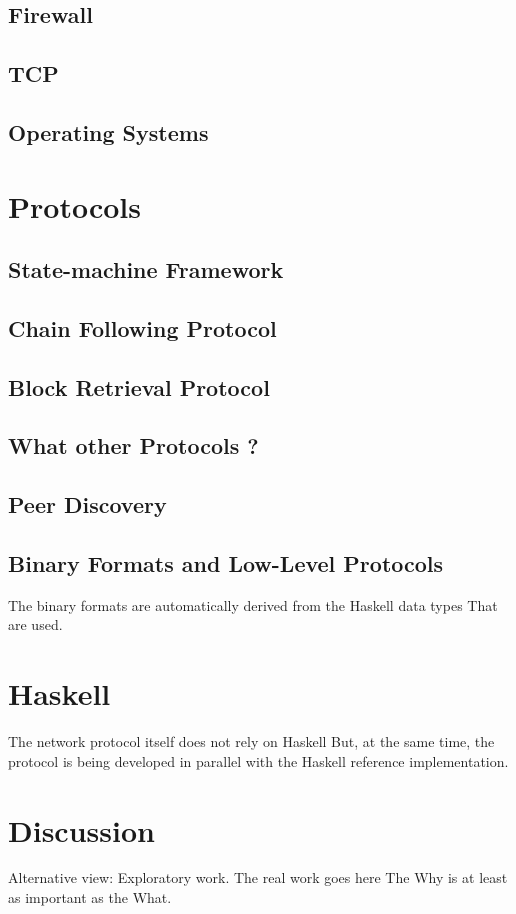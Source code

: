 \documentclass{report}
\theoremstyle{definition}{
  \newtheorem{lemma}{Lemma}[section] %
  \newtheorem{definition}[lemma]{Definition}
}
\theoremstyle{theorem}{
  \newtheorem{invariant}[lemma]{Invariant}
  \newtheorem{proofobligation}[lemma]{Proof Obligation}
}
\numberwithin{equation}{lemma}
\begin{document}
\section{Firewall}
\section{TCP}
\section{Operating Systems}

\chapter{Protocols}
\section{State-machine Framework}
\section{Chain Following Protocol}
\section{Block Retrieval Protocol}
\section{What other Protocols ?}
\section{Peer Discovery}
\section{Binary Formats and Low-Level Protocols}
The binary formats are automatically derived from the Haskell data types
That are used.

\chapter{Haskell}
The network protocol itself does not rely on Haskell
But, at the same time, the protocol is being developed in parallel with the
Haskell reference implementation.


\chapter{Discussion}
Alternative view: Exploratory work.
The real work goes here
The Why is at least as important as the What.
\end{document}
